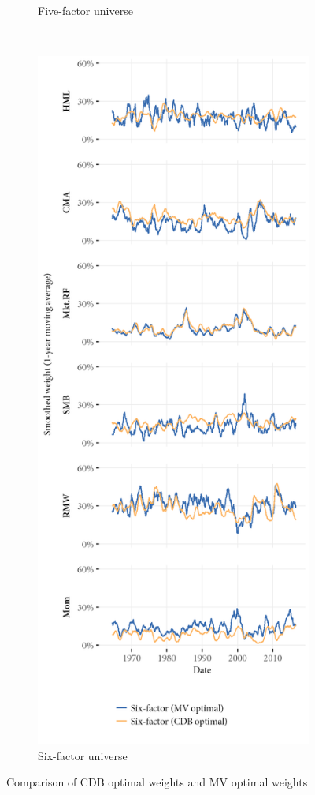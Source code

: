 \begin{figure}[p]
\begin{subfigure}{0.45\textwidth}
    \caption{Five-factor universe}
  \end{subfigure}
  ~
  \begin{subfigure}{0.45\textwidth}
    \includegraphics[width=\textwidth]{graphics/weights/compare_Weights_CDB_MV_6F.png}
    \caption{Six-factor universe}
  \end{subfigure}  
  \caption{Comparison of CDB optimal weights and MV optimal weights}
  \label{fig:cdb_mv_compare}


\end{figure}
